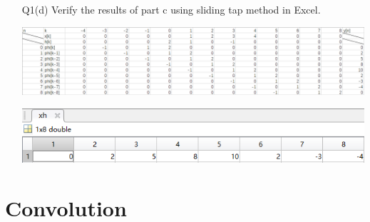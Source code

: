 \documentclass{article}
\begin{document}
\begin{enumerate}
\item[Q1(d)] Verify the results of part c using sliding tap method in Excel.

\includegraphics[width=\textwidth]{Question1CExcel.png}

\includegraphics[width=\textwidth]{Question1CMatlab.png}

\end{enumerate}

\section{Convolution}
\end{document}
